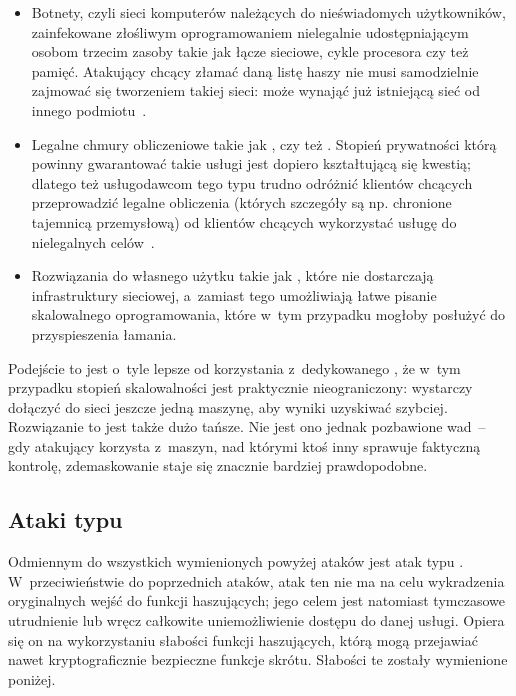 \begin{itemize}

    \item Botnety, czyli sieci komputerów należących do nieświadomych
    użytkowników, zainfekowane złośliwym oprogramowaniem nielegalnie
    udostępniającym osobom trzecim zasoby takie jak łącze sieciowe, cykle
    procesora czy też pamięć. Atakujący chcący złamać daną listę haszy nie musi
    samodzielnie zajmować się tworzeniem takiej sieci: może wynająć już
    istniejącą sieć od innego podmiotu~\cite{botnet_rental,botnet_rental2}.

    \item Legalne chmury obliczeniowe takie jak ,
     czy też . Stopień
    prywatności którą powinny gwarantować takie usługi jest dopiero
    kształtującą się kwestią; dlatego też usługodawcom tego typu trudno
    odróżnić klientów chcących przeprowadzić legalne obliczenia (których
    szczegóły są np. chronione tajemnicą przemysłową) od klientów chcących
    wykorzystać usługę do nielegalnych celów~\cite{cloud_criminals}.

    \item Rozwiązania do własnego użytku takie jak , które nie
    dostarczają infrastruktury sieciowej, a~zamiast tego umożliwiają łatwe
    pisanie skalowalnego oprogramowania, które w~tym przypadku mogłoby posłużyć
    do przyspieszenia łamania.

\end{itemize}

Podejście to jest o~tyle lepsze od korzystania z~dedykowanego ,
że w~tym przypadku stopień skalowalności jest praktycznie nieograniczony:
wystarczy dołączyć do sieci jeszcze jedną maszynę, aby wyniki uzyskiwać
szybciej. Rozwiązanie to jest także dużo tańsze. Nie jest ono jednak pozbawione
wad~-- gdy atakujący korzysta z~maszyn, nad którymi ktoś inny sprawuje
faktyczną kontrolę, zdemaskowanie staje się znacznie bardziej prawdopodobne.



\subsection{Ataki typu }
Odmiennym do wszystkich wymienionych powyżej ataków jest atak typu . W~przeciwieństwie do poprzednich ataków, atak ten nie ma na celu
wykradzenia oryginalnych wejść do funkcji haszujących; jego celem jest
natomiast tymczasowe utrudnienie lub wręcz całkowite uniemożliwienie dostępu do
danej usługi. Opiera się on na wykorzystaniu słabości funkcji haszujących,
którą mogą przejawiać nawet kryptograficznie bezpieczne funkcje skrótu.
Słabości te zostały wymienione poniżej.

